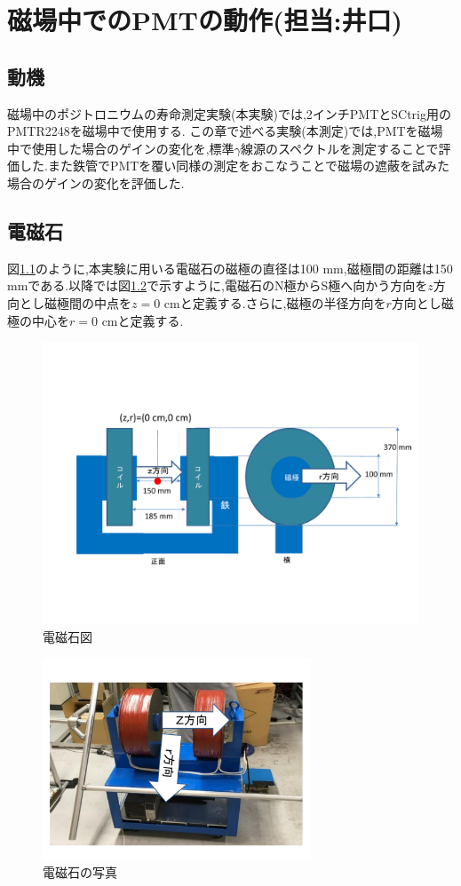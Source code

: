 \chapter{磁場中でのPMTの動作(担当:井口)}\label{PMT}


\section{動機}
磁場中のポジトロニウムの寿命測定実験(本実験)では,2インチPMTとSCtrig用のPMT\hspace{3pt}R2248\cite{pmtR2248}を磁場中で使用する.
この章で述べる実験(本測定)では,PMTを磁場中で使用した場合のゲインの変化を,標準$\gamma$線源のスペクトルを測定することで評価した.また鉄管でPMTを覆い同様の測定をおこなうことで磁場の遮蔽を試みた場合のゲインの変化を評価した.


\section{電磁石}
図\ref{magfigure}のように,本実験に用いる電磁石の磁極の直径は100 mm,磁極間の距離は150 mmである.以降では図\ref{magphoto}で示すように,電磁石のN極からS極へ向かう方向を$z$方向とし磁極間の中点を$z=0$ cmと定義する.さらに,磁極の半径方向を$r$方向とし磁極の中心を$r=0$ cmと定義する.
\begin{figure}[tbp]
	\centering
	\includegraphics[width=13cm]{fig/iguchi/magnetfigure.pdf}
	\caption{電磁石図}
	\label{magfigure}
\end{figure}

\begin{figure}[tbp]
	\centering
	\includegraphics[width=8cm]{fig/iguchi/magnetphoto.pdf}
	\caption{電磁石の写真}
	\label{magphoto}
\end{figure}

